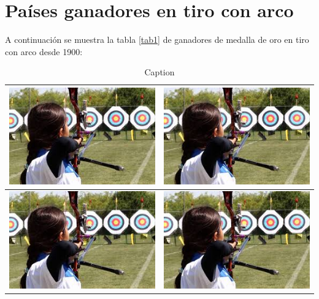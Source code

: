 \documentclass[12pt, legalpaper, twocolumn]{article}
\begin{document}
\newpage

\section{Países ganadores en tiro con arco}

A continuación se muestra la tabla \ref{tab1} de ganadores de medalla de oro en tiro con arco desde 1900:

\begin{table}[H]
    \centering
    \begin{tabular}{|c|c|}
    \hline
      \includegraphics[scale=1]{tiro_arco.jpg}     &  \includegraphics[scale=1]{tiro_arco.jpg}   \\
      \hline
      \includegraphics[scale=1]{tiro_arco.jpg}    & \includegraphics[scale=1]{tiro_arco.jpg} 
    \end{tabular}
    \caption{Caption}
    \label{tab:my_label}
\end{table}
\end{document}
